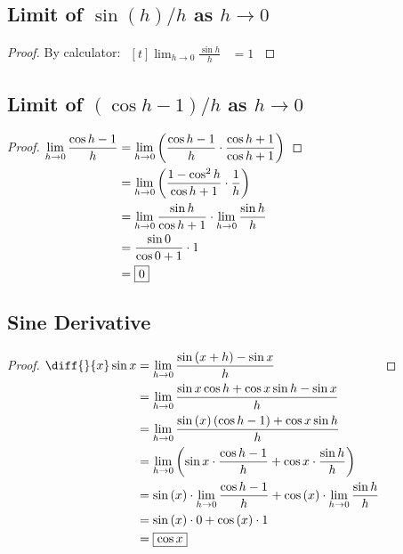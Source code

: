 \documentclass{article}
\begin{document}
\subsection{Limit of $\sin\left(h\right)/h$ as $h\to0$}
\label{proof:sinclimit}
\begin{proof}
	By calculator:
	$\begin{aligned}[t]
		\lim_{h\to0}\frac{\sin h}{h}&=\boxed{1}
	\end{aligned}$
\end{proof}

\subsection{Limit of $\left(\cos h-1\right)/h$ as $h\to0$}
\label{proof:coscminus1limit}
\begin{proof}
	$\begin{aligned}[t]
		\lim_{h\to0}\frac{\cos h-1}{h}
		&=\lim_{h\to0}\left(\frac{\cos h-1}{h}
			\cdot\frac{\cos h+1}{\cos h+1}\right) \\
		&=\lim_{h\to0}\left(\frac{1-\cos^2h}{\cos h+1}\cdot
			\frac{1}{h}\right) \\
		&=\lim_{h\to0}\frac{\sin h}{\cos h+1}\cdot
			\lim_{h\to0}\frac{\sin h}{h} \\
		&=\frac{\sin0}{\cos0+1}\cdot1 \\
		&=\boxed{0}
	\end{aligned} \\$
\end{proof}

\subsection{Sine Derivative}
\label{proof:sinderivative}
\begin{proof}
	$\begin{aligned}[t]
		\diff{}{x}\sin x&=\lim_{h\to0}
			\frac{\sin\left(x+h\right)-\sin x}{h} \\
		&=\lim_{h\to0}\frac{\sin x\cos h+\cos x\sin h-\sin x}{h} \\
		&=\lim_{h\to0}\frac{\sin\left(x\right)\left(\cos h-1\right)+
			\cos x\sin h}{h} \\
		&=\lim_{h\to0}\left(\sin x\cdot\frac{\cos h-1}{h}+
			\cos x\cdot\frac{\sin h}{h}\right) \\
		&=\sin\left(x\right)\cdot\lim_{h\to0}\frac{\cos h-1}
			{h}+\cos\left(x\right)\cdot\lim_{h\to0}\frac{\sin h}{h} \\
		&=\sin\left(x\right)\cdot0+\cos\left(x\right)\cdot1 \\
		&=\boxed{\cos x}
	\end{aligned} \\$
\end{proof}
\end{document}
